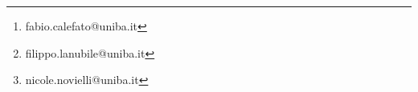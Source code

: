 \usepackage{authblk}

\author[1]{Fabio Calefato\thanks{fabio.calefato@uniba.it}}
\author[1]{Filippo Lanubile\thanks{filippo.lanubile@uniba.it}}
\author[2]{Nicole Novielli\thanks{nicole.novielli@uniba.it}}

\renewcommand\Authands{ and }
